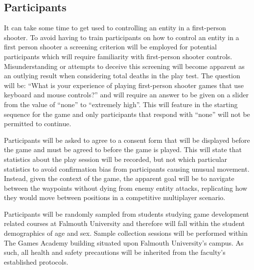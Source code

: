 \documentclass[journal]{IEEEtran}
\begin{document}
\subsection{Participants}

It can take some time to get used to controlling an entity in a first-person shooter. To avoid having to train participants on how to control an entity in a first person shooter a screening criterion will be employed for potential participants which will require familiarity with first-person shooter controls. Misunderstanding or attempts to deceive this screening will become apparent as an outlying result when considering total deaths in the play test. The question will be: ``What is your experience of playing first-person shooter games that use keyboard and mouse controls?'' and will require an answer to be given on a slider from the value of ``none'' to ``extremely high''. This will feature in the starting sequence for the game and only participants that respond with ``none'' will not be permitted to continue.

Participants will be asked to agree to a consent form that will be displayed before the game and must be agreed to before the game is played. This will state that statistics about the play session will be recorded, but not which particular statistics to avoid confirmation bias from participants causing unusual movement. Instead, given the context of the game, the apparent goal will be to navigate between the waypoints without dying from enemy entity attacks, replicating how they would move between positions in a competitive multiplayer scenario.

Participants will be randomly sampled from students studying game development related courses at Falmouth University and therefore will fall within the student demographics of age and sex. Sample collection sessions will be performed within The Games Academy building situated upon Falmouth University's campus. As such, all health and safety precautions will be inherited from the faculty's established protocols.







\end{document}
